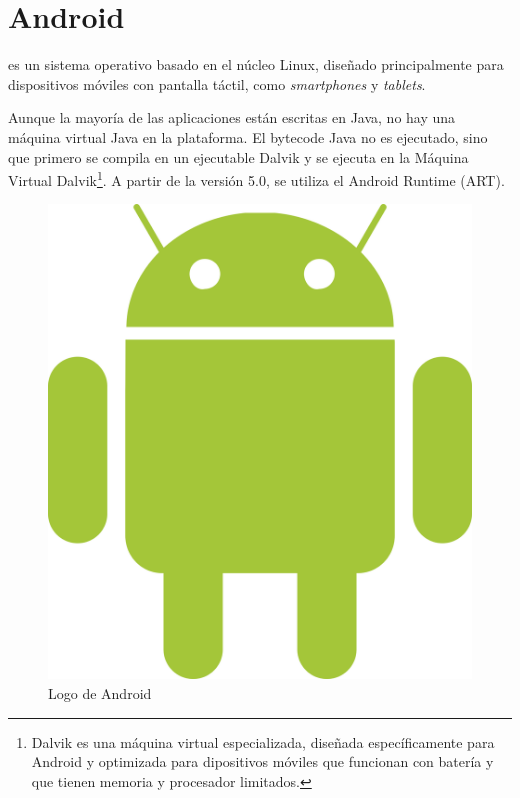 
 \section{Android}

  es un sistema operativo basado en el núcleo Linux, diseñado principalmente para dispositivos móviles con pantalla táctil, como \emph{smartphones} y \emph{tablets}.

 Aunque la mayoría de las aplicaciones están escritas en Java, no hay una máquina virtual Java en la plataforma.
 El bytecode Java no es ejecutado, sino que primero se compila en un ejecutable Dalvik y se ejecuta en la Máquina Virtual Dalvik\footnote{Dalvik es una máquina virtual especializada, diseñada específicamente para Android y optimizada para dipositivos móviles que funcionan con batería y que tienen memoria y procesador limitados.}.
 A partir de la versión 5.0, se utiliza el Android Runtime (ART). \emph{\parencite{Reference7}}

 \begin{figure}[ht]
   \centering
   \includegraphics[scale=0.05]{Figures/AndroidLogo}
   \decoRule
   \caption[Android (Logo)]{Logo de Android}
   \label{fig:AndroidLogo}
 \end{figure}

